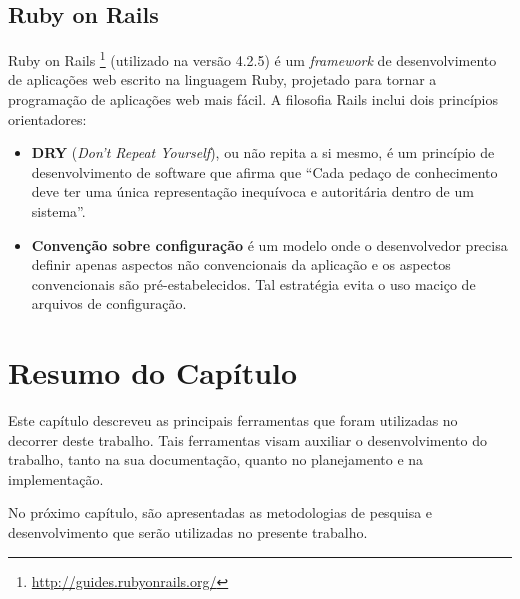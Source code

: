 \subsection{Ruby on Rails}

Ruby on Rails \footnote{\url{http://guides.rubyonrails.org/}} (utilizado na versão 4.2.5) é um \textit{framework} de desenvolvimento de aplicações web escrito na linguagem Ruby, projetado para tornar a programação de aplicações web mais fácil. A filosofia Rails inclui dois princípios orientadores:

\begin{itemize}
	\item \textbf{DRY} (\textit{Don't Repeat Yourself}), ou não repita a si mesmo, é um princípio de desenvolvimento de software que afirma que ``Cada pedaço de conhecimento deve ter uma única representação inequívoca e autoritária dentro de um sistema''\cite{wilson2012practices}.

	\item \textbf{Convenção sobre configuração} é um modelo onde o desenvolvedor precisa definir apenas aspectos não convencionais da aplicação e os aspectos convencionais são pré-estabelecidos. Tal estratégia evita o uso maciço de arquivos de configuração.
\end{itemize}

\section{Resumo do Capítulo}

Este capítulo descreveu as principais ferramentas que foram utilizadas no decorrer deste trabalho. Tais ferramentas visam auxiliar o desenvolvimento do trabalho, tanto na sua documentação, quanto no planejamento e na implementação.

No próximo capítulo, são apresentadas as metodologias de pesquisa e desenvolvimento que serão utilizadas no presente trabalho.
